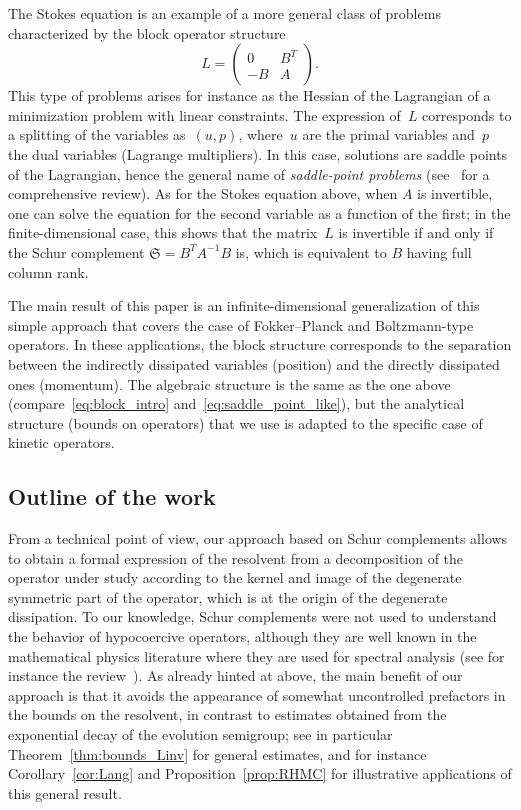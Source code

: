 \documentclass[AHL,Unicode,longabstracts,MathTools,published]{cedram}
\newcommand{\frkS}{\mathfrak{S}}
\begin{document}
The Stokes equation is an example of a more general class of problems characterized by the block operator structure
\begin{equation}\label{eq:block_intro}
L =
\begin{pmatrix}
0 & B^{T}\\
-B & A
\end{pmatrix}.
\end{equation}
This type of problems arises for instance as the Hessian of the Lagrangian of a minimization problem with linear constraints. The expression of~$L$ corresponds to a splitting of the variables as~$(u,p)$, where~$u$ are the primal variables and~$p$ the dual variables (Lagrange multipliers). In this case, solutions are saddle points of the Lagrangian, hence the general name of \emph{saddle-point problems} (see~\cite{benzi2005numerical} for a comprehensive review). As for the Stokes equation above, when $A$ is invertible, one can solve the equation for the second variable as a function of the first; in the finite-dimensional case, this shows that the matrix~$L$ is invertible if and only if the Schur complement $\frkS = B^{T} A^{-1} B$ is, which is equivalent to $B$ having full column rank.

The main result of this paper is an infinite-dimensional generalization of this simple approach that covers the case of Fokker--Planck and Boltzmann-type operators. In these applications, the block structure corresponds to the separation between the indirectly dissipated variables (position) and the directly dissipated ones (momentum). The algebraic structure is the same as the one above (compare~\eqref{eq:block_intro} and~\eqref{eq:saddle_point_like}), but the analytical structure (bounds on operators) that we use is adapted to the specific case of kinetic operators.

\subsection*{Outline of the work}
From a technical point of view, our approach based on Schur complements allows to obtain a formal expression of the resolvent from a decomposition of the operator under study according to the kernel and image of the degenerate symmetric part of the operator, which is at the origin of the degenerate dissipation. To our knowledge, Schur complements were not used to understand the behavior of hypocoercive operators, although they are well known in the mathematical physics literature where they are used for spectral analysis (see for instance the review~\cite{SZ07}). As already hinted at above, the main benefit of our approach is that it avoids the appearance of somewhat uncontrolled prefactors in the bounds on the resolvent, in contrast to estimates obtained from the exponential decay of the evolution semigroup; see in particular Theorem~\ref{thm:bounds_Linv} for general estimates, and for instance Corollary~\ref{cor:Lang} and Proposition~\ref{prop:RHMC} for illustrative applications of this general result.
\end{document}
